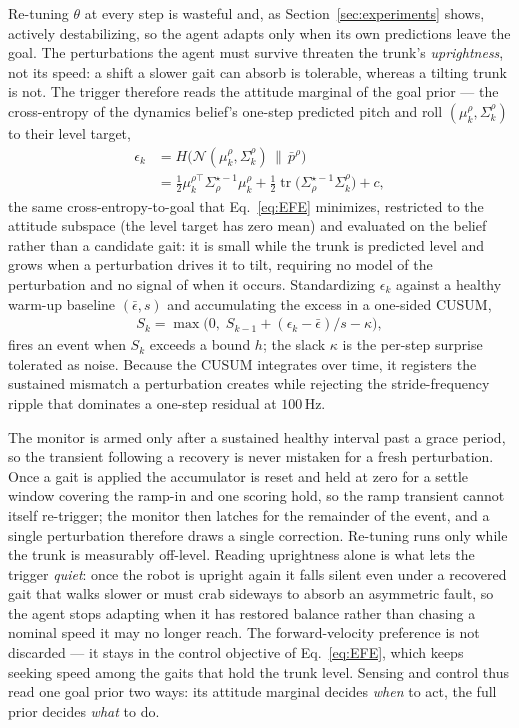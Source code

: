 \documentclass[letterpaper, 10 pt, conference]{ieeeconf}  %
\DeclareMathOperator{\tr}{tr}
\newcommand{\cN}{\mathcal{N}}
\begin{document}
Re-tuning $\theta$ at every step is wasteful and, as Section~\ref{sec:experiments} shows, actively destabilizing, so the agent adapts only when its own predictions leave the goal. The perturbations the agent must survive threaten the trunk's \emph{uprightness}, not its speed: a shift a slower gait can absorb is tolerable, whereas a tilting trunk is not. The trigger therefore reads the attitude marginal of the goal prior --- the cross-entropy of the dynamics belief's one-step predicted pitch and roll $(\mu_k^{\rho}, \Sigma_k^{\rho})$ to their level target,
\begin{align} \label{eq:trigger-err}
    \epsilon_k &= H\big(\cN(\mu_k^{\rho}, \Sigma_k^{\rho})\,\|\,\bar{p}^{\rho}\big) \\
    &= \tfrac{1}{2}\mu_k^{\rho\top}\Sigma^{\star-1}_{\rho}\mu_k^{\rho} + \tfrac{1}{2}\tr \big(\Sigma^{\star-1}_{\rho}\Sigma_k^{\rho}\big) + c ,
\end{align}
the same cross-entropy-to-goal that Eq.~\ref{eq:EFE} minimizes, restricted to the attitude subspace (the level target has zero mean) and evaluated on the belief rather than a candidate gait: it is small while the trunk is predicted level and grows when a perturbation drives it to tilt, requiring no model of the perturbation and no signal of when it occurs. Standardizing $\epsilon_k$ against a healthy warm-up baseline $(\bar{\epsilon}, s)$ and accumulating the excess in a one-sided CUSUM,
\begin{align} \label{eq:trigger-cusum}
    S_k = \max\big(0,\; S_{k-1} + (\epsilon_k - \bar{\epsilon})/s - \kappa \big) ,
\end{align}
fires an event when $S_k$ exceeds a bound $h$; the slack $\kappa$ is the per-step surprise tolerated as noise. Because the CUSUM integrates over time, it registers the sustained mismatch a perturbation creates while rejecting the stride-frequency ripple that dominates a one-step residual at $100$\,Hz.

The monitor is armed only after a sustained healthy interval past a grace period, so the transient following a recovery is never mistaken for a fresh perturbation. Once a gait is applied the accumulator is reset and held at zero for a settle window covering the ramp-in and one scoring hold, so the ramp transient cannot itself re-trigger; the monitor then latches for the remainder of the event, and a single perturbation therefore draws a single correction. Re-tuning runs only while the trunk is measurably off-level. Reading uprightness alone is what lets the trigger \emph{quiet}: once the robot is upright again it falls silent even under a recovered gait that walks slower or must crab sideways to absorb an asymmetric fault, so the agent stops adapting when it has restored balance rather than chasing a nominal speed it may no longer reach. The forward-velocity preference is not discarded --- it stays in the control objective of Eq.~\ref{eq:EFE}, which keeps seeking speed among the gaits that hold the trunk level. Sensing and control thus read one goal prior two ways: its attitude marginal decides \emph{when} to act, the full prior decides \emph{what} to do.
\end{document}
